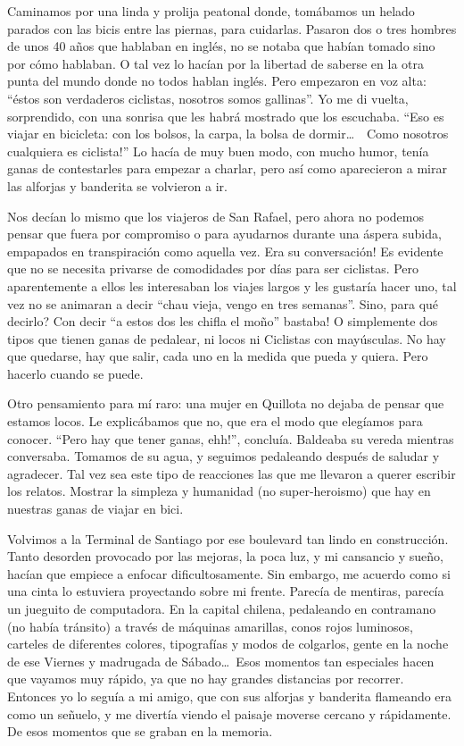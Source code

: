 Caminamos por una linda y prolija peatonal donde, tom\'abamos un helado parados
con las bicis entre las piernas, para cuidarlas. Pasaron dos o tres hombres de
unos 40 a\~nos que hablaban en ingl\'es, no se notaba que hab\'ian tomado sino
por c\'omo hablaban. O tal vez lo hac\'ian por la libertad de saberse en la otra
punta del mundo donde no todos hablan ingl\'es. Pero empezaron en voz alta:
``\'estos son verdaderos ciclistas, nosotros somos gallinas''. Yo me di vuelta,
sorprendido, con una sonrisa que les habr\'a mostrado que los escuchaba. ``Eso
es viajar en bicicleta: con los bolsos, la carpa, la bolsa de dormir\ldots\ \
\textexclamdown Como nosotros cualquiera es ciclista!'' Lo hac\'ia de muy buen
modo, con mucho humor, ten\'ia ganas de contestarles para empezar a charlar,
pero as\'i como aparecieron a mirar las alforjas y banderita se volvieron a ir.

Nos dec\'ian lo mismo que los viajeros de San Rafael, pero ahora no podemos
pensar que fuera por compromiso o para ayudarnos durante una \'aspera subida,
empapados en transpiraci\'on como aquella vez. \textexclamdown Era su
conversaci\'on! Es evidente que no se necesita privarse de comodidades por
d\'ias para ser ciclistas. Pero aparentemente a ellos les interesaban los viajes
largos y les gustar\'ia hacer uno, tal vez no se animaran a decir ``chau vieja,
vengo en tres semanas''. Sino, \textquestiondown para qu\'e decirlo?
\textexclamdown Con decir ``a estos dos les chifla el mo\~no'' bastaba! O
simplemente dos tipos que tienen ganas de pedalear, ni locos ni Ciclistas con
may\'usculas. No hay que quedarse, hay que salir, cada uno en la medida que
pueda y quiera. Pero hacerlo cuando se puede.

Otro pensamiento para m\'i raro: una mujer en Quillota no dejaba de pensar que
estamos locos. Le explic\'abamos que no, que era el modo que eleg\'iamos para
conocer. ``\textexclamdown Pero hay que tener ganas, ehh!'', conclu\'ia.
Baldeaba su vereda mientras conversaba. Tomamos de su agua, y seguimos
pedaleando despu\'es de saludar y agradecer. Tal vez sea este tipo de reacciones
las que me llevaron a querer escribir los relatos. Mostrar la simpleza y
humanidad (no super-heroismo) que hay en nuestras ganas de viajar en bici.

Volvimos a la Terminal de Santiago por ese boulevard tan lindo en
construcci\'on. Tanto desorden provocado por las mejoras, la poca luz, y mi
cansancio y sue\~no, hac\'ian que empiece a enfocar dificultosamente. Sin
embargo, me acuerdo como si una cinta lo estuviera proyectando sobre mi frente.
Parec\'ia de mentiras, parec\'ia un jueguito de computadora. En la capital
chilena, pedaleando en contramano (no hab\'ia tr\'ansito) a trav\'es de
m\'aquinas amarillas, conos rojos luminosos, carteles de diferentes colores,
tipograf\'ias y modos de colgarlos, gente en la noche de ese Viernes y madrugada
de S\'abado\ldots\ Esos momentos tan especiales hacen que vayamos muy r\'apido,
ya que no hay grandes distancias por recorrer. Entonces yo lo segu\'ia a mi
amigo, que con sus alforjas y banderita flameando era como un se\~nuelo, y me
divert\'ia viendo el paisaje moverse cercano y r\'apidamente. De esos momentos
que se graban en la memoria.

